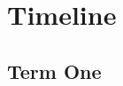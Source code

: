 \documentclass[]{final_report}
\begin{document}

\chapter{Timeline}

\section{Term One}

{
  \renewcommand{\arraystretch}{1.5}
  
}
\end{document}
